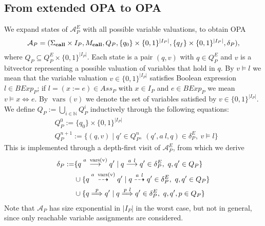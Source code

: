\documentclass[9pt,a4paper]{article}
\begin{document}
\subsection{From extended OPA to OPA}
We expand states of $\mathcal{A}^E_P$ with all possible variable valuations, to obtain OPA
\[\mathcal{A}_P = (\Sigma_{\mathbf{call}} \times I_P, M_{\mathbf{call}}, Q_P, \{q_0\} \times \{0, 1\}^{|I_P|}, \{q_f\} \times \{0, 1\}^{|I_P|}, \delta_P),\]
where $Q_P \subseteq Q^E_P \times \{0, 1\}^{|I_P|}$.
Each state is a pair $(q, v)$ with $q \in Q^E_P$ and $v$ is a bitvector representing a possible valuation of variables that hold in $q$.
By $v \models l$ we mean that the variable valuation $v \in \{0, 1\}^{|I_P|}$ satisfies Boolean expression $l \in \mathit{BExp}_P$; if $l = (x := e) \in \mathit{Ass}_P$ with $x \in I_P$ and $e \in \mathit{BExp}_P$ we mean $v \models x \iff e$. By $\operatorname{vars}(v)$ we denote the set of variables satisfied by $v \in \{0, 1\}^{|I_P|}$.
We define $Q_P := \bigcup_{i \in \mathbb{N}} Q_P^i$ inductively through the following equations:
\begin{align*}
  &Q_P^0 := \{q_0\} \times \{0, 1\}^{|I_P|} \\
  &Q_P^{n+1} := \{(q, v) \mid q' \in Q_P^n, \ (q', a \ l, q) \in \delta^E_P, \ v \models l\}
\end{align*}
This is implemented through a depth-first visit of $\mathcal{A}^E_P$, from which we derive
\begin{align*}
  \delta_P :=
    & \{q \stackrel{a \ \operatorname{vars(v)}}{\longrightarrow} q' \mid q \stackrel{a \ l}{\longrightarrow} q' \in \delta^E_P, \ q, q' \in Q_P\} \\
    & \cup \{q \stackrel{a \ \operatorname{vars(v)}}{\dashrightarrow} q' \mid q \stackrel{a \ l}{\dashrightarrow} q' \in \delta^E_P, \ q, q' \in Q_P\} \\
    & \cup \{q \stackrel{p}{\Longrightarrow} q' \mid q \stackrel{p \ l}{\Longrightarrow} q' \in \delta^E_P, \ q, q', p \in Q_P\}
\end{align*}
Note that $\mathcal{A}_P$ has size exponential in $|I_P|$ in the worst case, but not in general, since only reachable variable assignments are considered.
\end{document}
